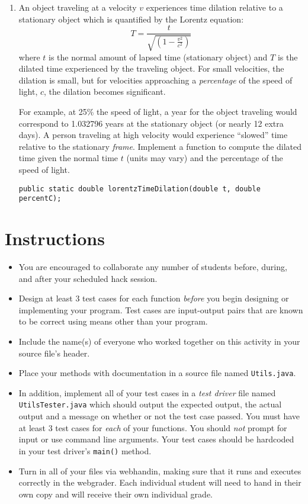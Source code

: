 \documentclass[12pt]{scrartcl}
\begin{document}
\begin{enumerate}
  \item An object traveling at a velocity $v$ experiences time dilation
  relative to a stationary object which is quantified by the Lorentz equation:
  $$T = \frac{t}{\sqrt{(1-\frac{v^2}{c^2})}}$$
  where $t$ is the normal amount of lapsed time (stationary object) 
  and $T$ is the dilated time experienced by the traveling object.  
  For small velocities, the dilation is small, but for velocities
  approaching a \emph{percentage} of the speed of light, $c$, the 
  dilation becomes significant.
  
  For example, at 25\% the speed of light, a year for the object 
  traveling would correspond to 1.032796 years at the stationary object 
  (or nearly 12 extra days).   A person traveling at high velocity 
  would experience ``slowed'' time
  relative to the stationary \emph{frame}.  Implement a function to 
  compute the dilated time given the normal time $t$ (units may vary)
  and the percentage of the speed of light.
\begin{verbatim}
public static double lorentzTimeDilation(double t, double percentC);
\end{verbatim}

\end{enumerate}  

\section*{Instructions}

\begin{itemize}
  \item You are encouraged to collaborate any number of students 
  before, during, and after your scheduled hack session.  
  \item Design at least 3 test cases for each function
  \emph{before} you begin
  designing or implementing your program.  Test cases are 
  input-output pairs that are known to be correct using means
  other than your program.
  \item Include the name(s) of everyone who worked together on
  this activity in your source file's header.
  \item Place your methods with documentation in a source file named 
    \texttt{Utils.java}.

  \item In addition, implement all of your test cases in a 
    \emph{test driver} file named \texttt{UtilsTester.java} 
    which should output the expected output, the actual
    output and a message on whether or not the test case passed. You
    must have at least 3 test cases for \emph{each} of your functions. You
    should \emph{not} prompt for input or use command line arguments. Your
    test cases should be hardcoded in your test driver's \texttt{main()} method.
    
  \item Turn in all of your files via webhandin, making sure that it runs
    and executes correctly in the webgrader. Each individual student
    will need to hand in their own copy and will receive their own
    individual grade.
\end{itemize}
  
\end{document}
